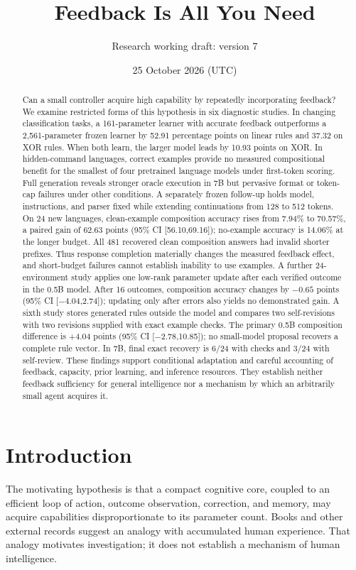 \documentclass[11pt]{article}
\title{Feedback Is All You Need}
\author{Research working draft: version 7}
\date{25 October 2026 (UTC)}
\begin{document}
\maketitle
\begin{abstract}
Can a small controller acquire high capability by repeatedly incorporating
feedback? We examine restricted forms of this hypothesis in six diagnostic
studies. In changing classification tasks, a 161-parameter learner with
accurate feedback outperforms a 2,561-parameter frozen learner by 52.91
percentage points on linear rules and 37.32 on XOR rules. When both learn,
the larger model leads by 10.93 points on XOR. In hidden-command languages,
correct examples provide no measured compositional benefit for the smallest
of four pretrained language models under first-token scoring. Full generation
reveals stronger oracle execution in 7B but pervasive format or token-cap
failures under other conditions. A separately frozen follow-up holds model,
instructions, and parser fixed while extending continuations from 128 to 512
tokens. On 24 new languages, clean-example composition accuracy rises from
7.94\% to 70.57\%, a paired gain of 62.63 points (95\% CI [56.10,69.16]);
no-example accuracy is 14.06\% at the longer budget. All 481 recovered clean
composition answers had invalid shorter prefixes. Thus response completion
materially changes the measured feedback effect, and short-budget failures
cannot establish inability to use examples. A further 24-environment study
applies one low-rank parameter update after each verified outcome in the 0.5B
model. After 16 outcomes, composition accuracy changes by $-0.65$ points
(95\% CI [$-4.04$,2.74]); updating only after errors also yields no demonstrated
gain. A sixth study stores generated rules outside the model and compares
two self-revisions with two revisions supplied with exact example checks.
The primary 0.5B composition difference is +4.04 points (95\% CI
[$-2.78$,10.85]); no small-model proposal recovers a complete rule vector.
In 7B, final exact recovery is 6/24 with checks and 3/24 with self-review.
These findings support conditional
adaptation and careful accounting of feedback, capacity, prior learning, and
inference resources. They establish neither feedback sufficiency for general
intelligence nor a mechanism by which an arbitrarily small agent acquires it.
\end{abstract}

\section{Introduction}
The motivating hypothesis is that a compact cognitive core, coupled to an
efficient loop of action, outcome observation, correction, and memory, may
acquire capabilities disproportionate to its parameter count. Books and other
external records suggest an analogy with accumulated human experience. That
analogy motivates investigation; it does not establish a mechanism of human
intelligence.
\end{document}
